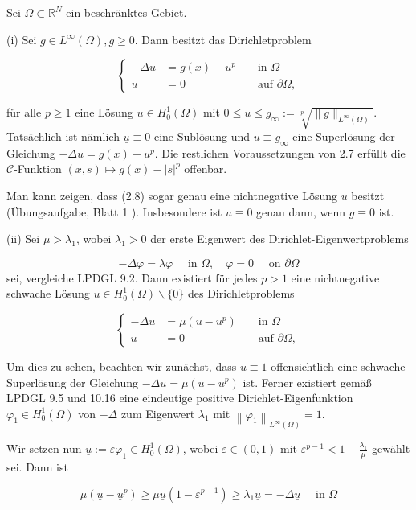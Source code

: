 \documentclass[10pt, letterpaper]{article}
\begin{document}
Sei $\Omega \subset \mathbb{R}^{N}$ ein beschränktes Gebiet.

(i) Sei $g \in L^{\infty}(\Omega), g \geq 0$. Dann besitzt das Dirichletproblem

$$
\left\{\begin{aligned}
-\Delta u & =g(x)-u^{p} & & \text { in } \Omega \\
u & =0 & & \text { auf } \partial \Omega,
\end{aligned}\right.
$$

für alle $p \geq 1$ eine Lösung $u \in H_{0}^{1}(\Omega)$ mit $0 \leq u \leq g_{\infty}:=\sqrt[p]{\|g\|_{L^{\infty}(\Omega)}}$. Tatsächlich ist nämlich $\underline{u} \equiv 0$ eine Sublösung und $\bar{u} \equiv g_{\infty}$ eine Superlösung der Gleichung $-\Delta u=g(x)-u^{p}$. Die restlichen Voraussetzungen von 2.7 erfüllt die $\mathcal{C}$-Funktion $(x, s) \mapsto g(x)-|s|^{p}$ offenbar.

Man kann zeigen, dass (2.8) sogar genau eine nichtnegative Lösung $u$ besitzt (Übungsaufgabe, Blatt 1 ). Insbesondere ist $u \equiv 0$ genau dann, wenn $g \equiv 0$ ist.

(ii) Sei $\mu>\lambda_{1}$, wobei $\lambda_{1}>0$ der erste Eigenwert des Dirichlet-Eigenwertproblems

$$
-\Delta \varphi=\lambda \varphi \quad \text { in } \Omega, \quad \varphi=0 \quad \text { on } \partial \Omega
$$
sei, vergleiche LPDGL 9.2. Dann existiert für jedes $p>1$ eine nichtnegative schwache Lösung $u \in H_{0}^{1}(\Omega) \backslash\{0\}$ des Dirichletproblems

$$
\left\{\begin{aligned}
-\Delta u & =\mu\left(u-u^{p}\right) & & \text { in } \Omega \\
u & =0 & & \text { auf } \partial \Omega,
\end{aligned}\right.
$$

Um dies zu sehen, beachten wir zunächst, dass $\bar{u} \equiv 1$ offensichtlich eine schwache Superlösung der Gleichung $-\Delta u=\mu\left(u-u^{p}\right)$ ist. Ferner existiert gemäß LPDGL 9.5 und 10.16 eine eindeutige positive Dirichlet-Eigenfunktion $\varphi_{1} \in H_{0}^{1}(\Omega)$ von $-\Delta$ zum Eigenwert $\lambda_{1}$ mit $\left\|\varphi_{1}\right\|_{L^{\infty}(\Omega)}=1$.

Wir setzen nun $\underline{u}:=\varepsilon \varphi_{1} \in H_{0}^{1}(\Omega)$, wobei $\varepsilon \in(0,1)$ mit $\varepsilon^{p-1}<1-\frac{\lambda_{1}}{\mu}$ gewählt sei. Dann ist

$$
\mu\left(\underline{u}-\underline{u}^{p}\right) \geq \mu \underline{u}\left(1-\varepsilon^{p-1}\right) \geq \lambda_{1} \underline{u}=-\Delta \underline{u} \quad \text { in } \Omega
$$
\end{document}
